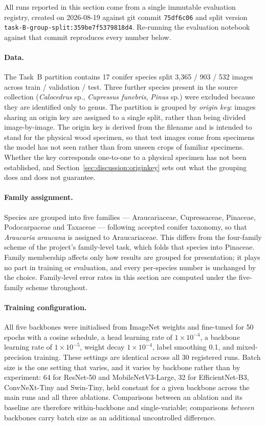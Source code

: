 All runs reported in this section come from a single immutable evaluation
registry, created on 2026-08-19 against git commit
\texttt{75df6c06} and split version
\texttt{task-B-group-split:\allowbreak 359be7f5379818d4}. Re-running the evaluation
notebook against that commit reproduces every number below.

\paragraph{Data.} The Task~B partition contains 17 conifer species split
3{,}365 / 903 / 532 images across train / validation / test. Three further
species present in the source collection
(\textit{Calocedrus} sp., \textit{Cupressus funebris},
\textit{Pinus} sp.) were excluded because they are identified only to genus.
The partition is grouped by \emph{origin key}: images sharing an origin key
are assigned to a single split, rather than being divided image-by-image. The
origin key is derived from the filename and is intended to stand for the
physical wood specimen, so that test images come from specimens the model has
not seen rather than from unseen crops of familiar specimens. Whether the key
corresponds one-to-one to a physical specimen has not been established, and
Section~\ref{sec:discussion:originkey} sets out what the grouping does and
does not guarantee.

\paragraph{Family assignment.} Species are grouped into five families ---
Araucariaceae, Cupressaceae, Pinaceae, Podocarpaceae and Taxaceae --- following
accepted conifer taxonomy, so that \textit{Araucaria araucana} is assigned to
Araucariaceae. This differs from the four-family scheme of the project's
family-level task, which folds that species into Pinaceae. Family membership
affects only how results are grouped for presentation; it plays no part in
training or evaluation, and every per-species number is unchanged by the
choice. Family-level error rates in this section are computed under the
five-family scheme throughout.

\paragraph{Training configuration.} All five backbones were initialised from
ImageNet weights and fine-tuned for 50 epochs with a cosine schedule, a head
learning rate of $1\times10^{-4}$, a backbone learning rate of
$1\times10^{-5}$, weight decay $1\times10^{-4}$, label smoothing 0.1, and
mixed-precision training. These settings are identical across all 30
registered runs. Batch size is the one setting that varies, and it varies by
backbone rather than by experiment: 64 for ResNet-50 and MobileNetV3-Large,
32 for EfficientNet-B3, ConvNeXt-Tiny and Swin-Tiny, held constant for a
given backbone across the main runs and all three ablations. Comparisons
between an ablation and its baseline are therefore within-backbone and
single-variable; comparisons \emph{between} backbones carry batch size as an
additional uncontrolled difference.

